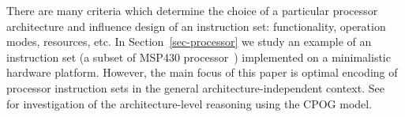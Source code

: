 There are many criteria which determine the choice of a particular
processor architecture and influence design of an instruction set:
functionality, operation modes, resources, etc. In Section~\ref{sec-processor}
we study an example of an instruction set (a subset of MSP430
processor~\cite{mspmanual}) implemented on a minimalistic hardware
platform. However, the main focus of this paper is optimal encoding
of processor instruction sets in the general architecture-independent
context. See~\cite{2011_mokhov_tr} for investigation of the architecture-level
reasoning using the CPOG model.

